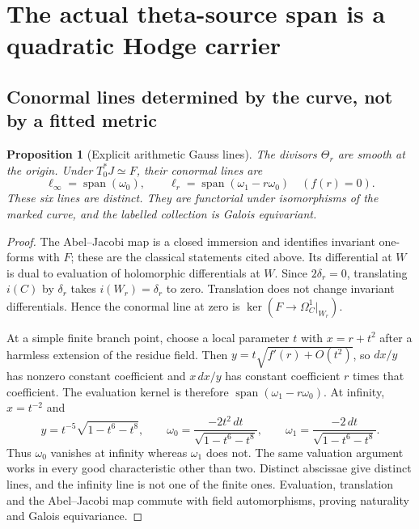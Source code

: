 \documentclass[11pt]{article}
\newtheorem{proposition}[proposition]{Proposition}
\theoremstyle{definition}
\theoremstyle{remark}
\newcommand{\Span}{\operatorname{span}}
\begin{document}
\section{The actual theta-source span is a quadratic Hodge carrier}
\label{sec:v6-jet}

\subsection{Conormal lines determined by the curve, not by a fitted metric}
\begin{proposition}[Explicit arithmetic Gauss lines]
\label{prop:v6-Gauss}
The divisors $\Theta_r$ are smooth at the origin. Under $T_0^*J\simeq F$,
their conormal lines are
\begin{equation}
 \boxed{
 \ell_\infty=\Span(\omega_0),\qquad
 \ell_r=\Span(\omega_1-r\omega_0)\quad(f(r)=0).}
 \label{eq:v6-Gauss-lines}
\end{equation}
These six lines are distinct. They are functorial under isomorphisms of
the marked curve, and the labelled collection is Galois equivariant.
\end{proposition}
\begin{proof}
The Abel--Jacobi map is a closed immersion and identifies invariant
one-forms with $F$; these are the classical statements cited above. Its
differential at $W$ is dual to evaluation of holomorphic differentials
at $W$. Since $2\delta_r=0$, translating $i(C)$ by $\delta_r$ takes
$i(W_r)=\delta_r$ to zero. Translation does not change invariant
differentials. Hence the conormal line at zero is
$\ker(F\to\Omega_C^1|_{W_r})$.

At a simple finite branch point, choose a local parameter $t$ with
$x=r+t^2$ after a harmless extension of the residue field. Then
$y=t\sqrt{f'(r)+O(t^2)}$, so $dx/y$ has nonzero constant coefficient
and $x\,dx/y$ has constant coefficient $r$ times that coefficient.
The evaluation kernel is therefore $\Span(\omega_1-r\omega_0)$.
At infinity, $x=t^{-2}$ and
\[
 y=t^{-5}\sqrt{1-t^6-t^8},\qquad
 \omega_0=\frac{-2t^2\,dt}{\sqrt{1-t^6-t^8}},\qquad
 \omega_1=\frac{-2\,dt}{\sqrt{1-t^6-t^8}}.
\]
Thus $\omega_0$ vanishes at infinity whereas $\omega_1$ does not.
The same valuation argument works in every good characteristic other
than two. Distinct abscissae give distinct lines, and the infinity line
is not one of the finite ones. Evaluation, translation and the
Abel--Jacobi map commute with field automorphisms, proving naturality
and Galois equivariance.
\end{proof}
\end{document}
